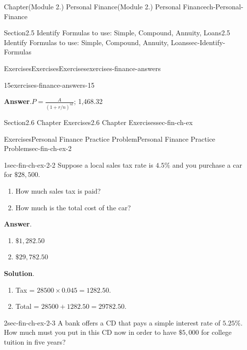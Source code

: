 \documentclass[oneside,10pt,]{book}
\newcommand{\blocktitlefont}{\relax}
\begin{document}
\begin{chapterptx}{Chapter}{(Module 2.) Personal Finance}{}{(Module 2.) Personal Finance}{}{}{ch-Personal-Finance}
\begin{sectionptx}{Section}{2.5 Identify Formulas to use: Simple, Compound, Annuity, Loans}{}{2.5 Identify Formulas to use: Simple, Compound, Annuity, Loans}{}{}{sec-Identify-Formulas}
\begin{exercises-subsection-numberless}{Exercises}{Exercises}{}{Exercises}{}{}{exercises-finance-answers}
\begin{divisionexercise}{15}{}{}{exercises-finance-answers-15}
\par\smallskip%
\noindent\textbf{\blocktitlefont Answer}.\hypertarget{exercises-finance-answers-15-2}{}\quad{}\(P = \frac{A}{(1+r/n)^{nt}}\); \textdollar{}1,468.32%
\end{divisionexercise}%
\end{exercises-subsection-numberless}
\end{sectionptx}
%
%
\typeout{************************************************}
\typeout{************************************************}
%
\begin{sectionptx}{Section}{2.6 Chapter Exercises}{}{2.6 Chapter Exercises}{}{}{sec-fin-ch-ex}
%
%
\typeout{************************************************}
\typeout{************************************************}
%
\begin{exercises-subsection-numberless}{Exercises}{Personal Finance Practice Problem}{}{Personal Finance Practice Problem}{}{}{sec-fin-ch-ex-2}
\begin{divisionexercise}{1}{}{}{sec-fin-ch-ex-2-2}%
Suppose a local sales tax rate is \(4.5\%\) and you purchase a car for \(\$28,500\).%
\begin{enumerate}[label={\alph*}]
\item{}How much sales tax is paid?%
\item{}How much is the total cost of the car?%
\end{enumerate}
%
\par\smallskip%
\noindent\textbf{\blocktitlefont Answer}.\hypertarget{sec-fin-ch-ex-2-2-2}{}\quad{}%
\begin{enumerate}[label={\alph*}]
\item{}\(\displaystyle \$1,282.50\)%
\item{}\(\displaystyle \$29,782.50\)%
\end{enumerate}
%
\par\smallskip%
\noindent\textbf{\blocktitlefont Solution}.\hypertarget{sec-fin-ch-ex-2-2-3}{}\quad{}%
\begin{enumerate}[label={\alph*}]
\item{}Tax = \(28500 \times 0.045 = 1282.50\).%
\item{}Total = \(28500 + 1282.50 = 29782.50\).%
\end{enumerate}
%
\end{divisionexercise}%
\begin{divisionexercise}{2}{}{}{sec-fin-ch-ex-2-3}%
A bank offers a CD that pays a simple interest rate of \(5.25\%\). How much must you put in this CD now in order to have \(\$5,000\) for college tuition in five years?%

\end{divisionexercise}
\end{exercises-subsection-numberless}
\end{sectionptx}
\end{chapterptx}
\end{document}
